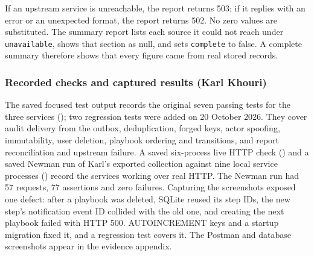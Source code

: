 If an upstream service is unreachable, the report returns 503; if it replies with an error or an unexpected format, the report returns 502. No zero values are substituted. The summary report lists each source it could not reach under \texttt{unavailable}, shows that section as null, and sets \texttt{complete} to false. A complete summary therefore shows that every figure came from real stored records.

\subsubsection{Recorded checks and captured results (Karl Khouri)}

The saved focused test output records the original seven passing tests for the three services (); two regression tests were added on 20 October 2026. They cover audit delivery from the outbox, deduplication, forged keys, actor spoofing, immutability, user deletion, playbook ordering and transitions, and report reconciliation and upstream failure. A saved six-process live HTTP check () and a saved Newman run of Karl's exported collection against nine local service processes () record the services working over real HTTP. The Newman run had 57 requests, 77 assertions and zero failures. Capturing the screenshots exposed one defect: after a playbook was deleted, SQLite reused its step IDs, the new step's notification event ID collided with the old one, and creating the next playbook failed with HTTP 500. AUTOINCREMENT keys and a startup migration fixed it, and a regression test covers it. The Postman and database screenshots appear in the evidence appendix.

